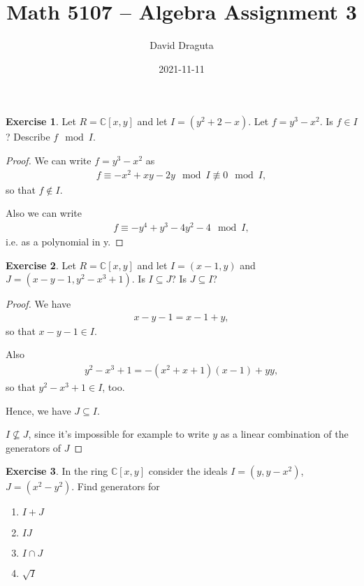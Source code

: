 \documentclass[12pt]{extarticle}
\title{ Math 5107 -- Algebra Assignment 3}
\author{David Draguta}
\date{2021-11-11}
\newcommand{\C}{\mathbb{C}}
\newcommand{\<}{\langle}
\renewcommand{\>}{\rangle}
\theoremstyle{definition}
\newtheorem{exercise}{Exercise}
\begin{document}
\maketitle

\begin{exercise}
  Let $R=\C[x,y]$ and let $I=(y^2+2-x)$. Let $f=y^3-x^2$. Is $f \in I$? Describe $f \mod I$.
\end{exercise}
\begin{proof}
  We can write $f=y^3-x^2$ as
  \begin{align}
    f \equiv -x^2+xy-2y \mod I \not \equiv 0 \mod I ,
  \end{align}
  so that $f \not \in I$.

  Also we can write
  \begin{align*}
    f \equiv -y^4 + y^3 - 4y^2 - 4 \mod I ,
  \end{align*}
  i.e. as a polynomial in y.
\end{proof}
\begin{exercise}
  Let $R=\C[x,y]$ and let $I=(x-1,y)$ and $J=(x-y-1, y^2-x^3+1)$. Is $I \subseteq J$? Is $J \subseteq I$?
\end{exercise}
\begin{proof}
  We have
  \begin{align}
    x-y-1 = x-1 + y,
  \end{align}
  so that $x-y-1 \in I$.

  Also
  \begin{align}
    y^2-x^3+1 = -(x^2+x+1)(x-1) + yy,
  \end{align}
  so that $y^2-x^3+1 \in I$, too.

  Hence, we have $J \subseteq I$.

  $I \not \subseteq J$, since it's impossible for example to write $y$ as a linear combination of the generators of $J$

\end{proof}

\begin{exercise}
  In the ring $\C[x,y]$ consider the ideals $I = (y,y-x^2)$, $J= (x^2 - y^2)$. Find generators for
  \begin{enumerate}
  \item
    $I + J$
  \item
    $IJ$
  \item
    $I \cap J$
  \item
    $\sqrt{I}$
  \end{enumerate}
\end{exercise}
\end{document}

